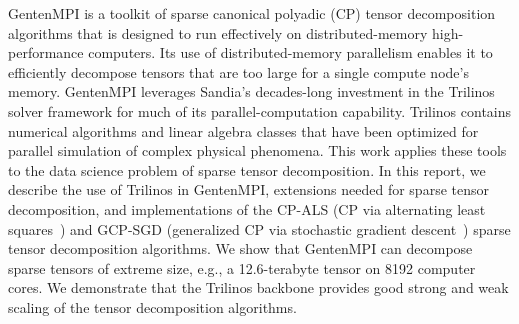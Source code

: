GentenMPI is a toolkit of sparse canonical polyadic (CP)
tensor decomposition algorithms that is
designed to run effectively on distributed-memory high-performance computers.
Its use of distributed-memory parallelism enables it to efficiently 
decompose tensors that are too large for a single compute node's memory.
GentenMPI leverages Sandia's decades-long investment in the Trilinos solver
framework for much of its parallel-computation capability.  Trilinos contains
numerical algorithms and linear algebra classes that have been optimized for
parallel simulation of complex physical phenomena.  This work applies these 
tools to the data science problem of sparse tensor decomposition.  In this
report, we describe the use of Trilinos in GentenMPI, extensions needed 
for sparse tensor decomposition, and implementations of the CP-ALS
(CP via alternating least squares~\cite{CC70,Harshman70}) and 
GCP-SGD (generalized CP via 
stochastic gradient descent~\cite{HKD18, HoKoDu20, KH19})
sparse tensor decomposition algorithms.  We show that GentenMPI can 
decompose sparse tensors of extreme size, e.g., a 12.6-terabyte
tensor on 8192 computer cores.  We demonstrate that the Trilinos backbone 
provides good strong and weak scaling of the tensor decomposition algorithms.
